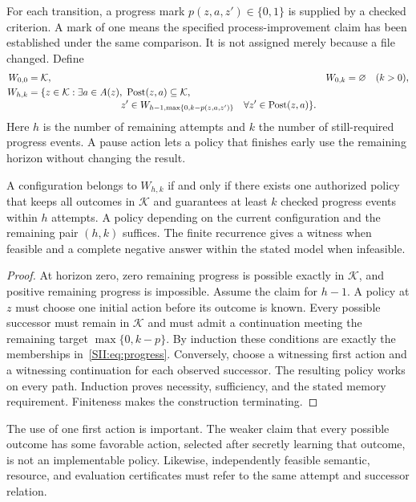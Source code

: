 For each transition, a progress mark $p(z,a,z')\in\{0,1\}$ is supplied by a checked criterion. A mark of one means the specified process-improvement claim has been established under the same comparison. It is not assigned merely because a file changed. Define
\begin{align}\label{SII:eq:progress}
W_{0,0}&=\mathcal K, & W_{0,k}&=\varnothing\quad(k>0),\\
W_{h,k}&=\{z\in\mathcal K:\exists a\in A(z),\ \SIIPost(z,a)\subseteq\mathcal K,\nonumber\\[-2pt]
&\hspace{34mm} z'\in W_{h-1,\max\{0,k-p(z,a,z')\}}
\quad\forall z'\in\SIIPost(z,a)\}.\nonumber
\end{align}
Here $h$ is the number of remaining attempts and $k$ the number of still-required progress events. A pause action lets a policy that finishes early use the remaining horizon without changing the result.

\begin{SIItheorem}\label{SII:thm:progress}
A configuration belongs to $W_{h,k}$ if and only if there exists one authorized policy that keeps all outcomes in $\mathcal K$ and guarantees at least $k$ checked progress events within $h$ attempts. A policy depending on the current configuration and the remaining pair $(h,k)$ suffices. The finite recurrence gives a witness when feasible and a complete negative answer within the stated model when infeasible.
\end{SIItheorem}
\begin{proof}
At horizon zero, zero remaining progress is possible exactly in $\mathcal K$, and positive remaining progress is impossible. Assume the claim for $h-1$. A policy at $z$ must choose one initial action before its outcome is known. Every possible successor must remain in $\mathcal K$ and must admit a continuation meeting the remaining target $\max\{0,k-p\}$. By induction these conditions are exactly the memberships in~\eqref{SII:eq:progress}. Conversely, choose a witnessing first action and a witnessing continuation for each observed successor. The resulting policy works on every path. Induction proves necessity, sufficiency, and the stated memory requirement. Finiteness makes the construction terminating.
\end{proof}

The use of one first action is important. The weaker claim that every possible outcome has some favorable action, selected after secretly learning that outcome, is not an implementable policy. Likewise, independently feasible semantic, resource, and evaluation certificates must refer to the same attempt and successor relation.

